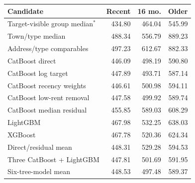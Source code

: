\begin{tabular}{lrrr}
\toprule
Candidate & Recent & 16 mo. & Older \\
\midrule
Target-visible group median$^{*}$ & 434.80 & 464.04 & 545.99 \\
Town/type median & 488.34 & 556.79 & 889.23 \\
Address/type comparables & 497.23 & 612.67 & 882.33 \\
CatBoost direct & 446.09 & 498.19 & 590.80 \\
CatBoost log target & 447.89 & 493.71 & 587.14 \\
CatBoost recency weights & 446.61 & 500.98 & 594.11 \\
CatBoost low-rent removal & 447.58 & 499.92 & 589.74 \\
CatBoost median residual & 455.85 & 589.03 & 608.29 \\
LightGBM & 467.98 & 532.25 & 638.03 \\
XGBoost & 467.78 & 520.36 & 624.34 \\
Direct/residual mean & 448.31 & 529.28 & 594.53 \\
Three CatBoost + LightGBM & 447.81 & 501.69 & 591.95 \\
Six-tree-model mean & 448.53 & 497.48 & 589.37 \\
\bottomrule
\end{tabular}

